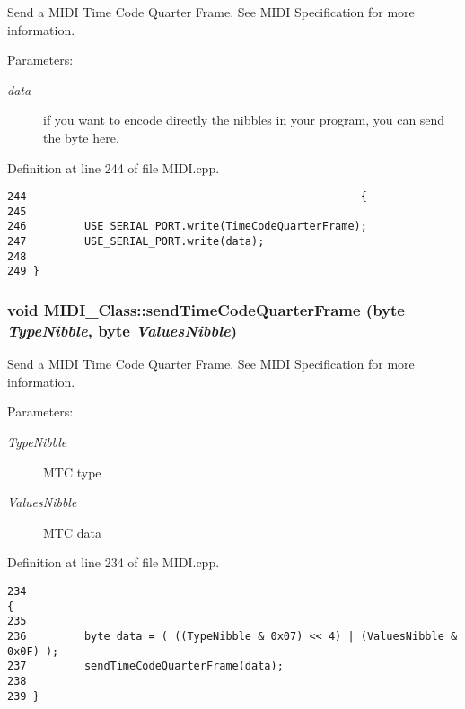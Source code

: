 Send a MIDI Time Code Quarter Frame. See MIDI Specification for more information. \begin{Desc}
\item[Parameters:]
\begin{description}
\item[{\em data}]if you want to encode directly the nibbles in your program, you can send the byte here. \end{description}
\end{Desc}


Definition at line 244 of file MIDI.cpp.

\begin{Code}\begin{verbatim}244                                                    {
245         
246         USE_SERIAL_PORT.write(TimeCodeQuarterFrame);
247         USE_SERIAL_PORT.write(data);
248         
249 }
\end{verbatim}
\end{Code}


\hypertarget{class_m_i_d_i___class_d9b1bd53330652f0360a0a6ed80b5b9d}{
\subsubsection[{sendTimeCodeQuarterFrame}]{\setlength{\rightskip}{0pt plus 5cm}void MIDI\_\-Class::sendTimeCodeQuarterFrame ({\bf byte} {\em TypeNibble}, \/  {\bf byte} {\em ValuesNibble})}}
\label{class_m_i_d_i___class_d9b1bd53330652f0360a0a6ed80b5b9d}


Send a MIDI Time Code Quarter Frame. See MIDI Specification for more information. \begin{Desc}
\item[Parameters:]
\begin{description}
\item[{\em TypeNibble}]MTC type \item[{\em ValuesNibble}]MTC data \end{description}
\end{Desc}


Definition at line 234 of file MIDI.cpp.

\begin{Code}\begin{verbatim}234                                                                             {
235         
236         byte data = ( ((TypeNibble & 0x07) << 4) | (ValuesNibble & 0x0F) );
237         sendTimeCodeQuarterFrame(data);
238         
239 }
\end{verbatim}
\end{Code}


